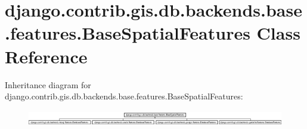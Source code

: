 \hypertarget{classdjango_1_1contrib_1_1gis_1_1db_1_1backends_1_1base_1_1features_1_1_base_spatial_features}{}\section{django.\+contrib.\+gis.\+db.\+backends.\+base.\+features.\+Base\+Spatial\+Features Class Reference}
\label{classdjango_1_1contrib_1_1gis_1_1db_1_1backends_1_1base_1_1features_1_1_base_spatial_features}
Inheritance diagram for django.\+contrib.\+gis.\+db.\+backends.\+base.\+features.\+Base\+Spatial\+Features\+:\begin{figure}[H]
\begin{center}
\leavevmode
\includegraphics[height=0.687961cm]{classdjango_1_1contrib_1_1gis_1_1db_1_1backends_1_1base_1_1features_1_1_base_spatial_features}
\end{center}
\end{figure}
